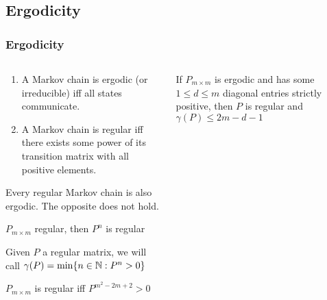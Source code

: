 \subsection{Ergodicity}
 \begin{frame}\frametitle{Ergodicity}
    \vspace{2em}
    \begin{columns}
    \begin{column}{0.5\textwidth}
        \begin{definition}
        \begin{enumerate}
        \item A Markov chain is ergodic (or irreducible) iff all states communicate.
        \item A Markov chain is regular iff there exists some power of its transition 
        matrix with all positive elements.
        \end{enumerate}
        \end{definition}

        \begin{proposition}
        Every regular Markov chain is also ergodic. The opposite does not hold.
        \end{proposition}

        \begin{lemma}
        \(P_{m\times m}\) regular, then \(P^n\) is regular
        \end{lemma}
        
        \begin{definition}
        Given \(P\) a regular matrix, we will call \(\gamma(P) = \min\{n \in \mathbb{N}: P^n > 0\}\)
        \end{definition}
        
        \begin{corollary}
        \(P_{m \times m}\) is regular iff \(P^{m^2 - 2m + 2} > 0\)
        \end{corollary}
    \end{column}
    \begin{column}{0.5\textwidth}
        \begin{lemma}
        If \(P_{m \times m}\) is ergodic and has some \(1 \le d \le m\) diagonal entries 
        strictly positive, then \(P\) is regular and \(\gamma(P) \le 2m - d - 1\)
        \end{lemma}
        
        \begin{theorem}


\end{theorem}
\end{column}
\end{columns}
\end{frame}
